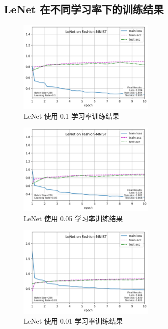 \documentclass[UTF8]{ctexart}
\begin{document}
\subsection{LeNet 在不同学习率下的训练结果}
\begin{center}
\begin{minipage}{\textwidth}
\begin{figure}[H]
    \centering
    \includegraphics[width=0.6\textwidth]{picture/lenet_on_fashion-mnist_bs256_lr0.1_20241110_221026.png}
    \caption{LeNet 使用 0.1 学习率训练结果}
\end{figure}
\vfill  %

\begin{figure}[H]
    \centering
    \includegraphics[width=0.6\textwidth]{picture/lenet_on_fashion-mnist_bs256_lr0.05_20241110_221637.png}
    \caption{LeNet 使用 0.05 学习率训练结果}
\end{figure}
\vfill  %

\begin{figure}[H]
    \centering
    \includegraphics[width=0.6\textwidth]{picture/lenet_on_fashion-mnist_bs256_lr0.01_20241110_222304.png}
    \caption{LeNet 使用 0.01 学习率训练结果}
\end{figure}
\end{minipage}
\end{center}
\end{document}
